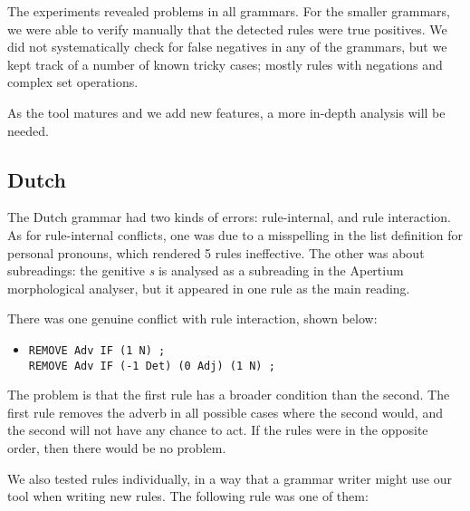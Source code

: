 The experiments revealed problems in all grammars. For the smaller
grammars, we were able to verify manually that the detected rules were
true positives.
We did not systematically check for false negatives in any of the
grammars, but we kept track of a number of known tricky cases; mostly
rules with negations and complex set operations.

As the tool matures and we add new features, a more in-depth analysis
will be needed.

\subsection{Dutch} The Dutch grammar had two kinds of errors: rule-internal, and rule interaction. As for rule-internal conflicts, one was due to a misspelling in the list definition for personal pronouns, which rendered 5 rules ineffective. The other was about subreadings: the genitive \emph{s} is analysed as a subreading in the Apertium morphological analyser, but it appeared in one rule as the main reading. 

There was one genuine conflict with rule interaction, shown below:

\begin{itemize}
\item[] 
\begin{verbatim}REMOVE Adv IF (1 N) ;
REMOVE Adv IF (-1 Det) (0 Adj) (1 N) ;
\end{verbatim}
\end{itemize}

The problem is that the first rule has a broader condition than the second.
The first rule removes the adverb in all possible cases where the second would, and the second will not have any chance to act. 
If the rules were in the opposite order, then there would be no problem.



We also tested rules individually, in a way that a grammar writer might use our tool when writing new rules.
The following rule was one of them:

